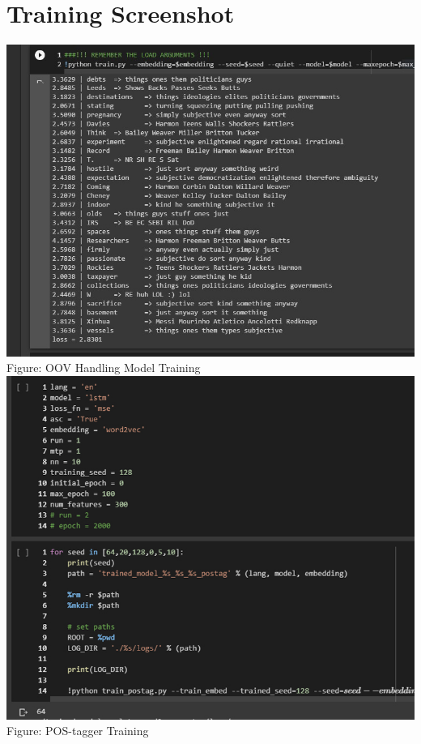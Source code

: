 \documentclass[a4paper,12pt]{report}
\begin{document}
\section*{Training Screenshot}
\centering
\includegraphics[width=.8\linewidth]{images/train_oovmodel.jpg}\\
Figure: OOV Handling Model Training
\centering
\includegraphics[width=.8\linewidth]{images/train_postag.jpg}\\
Figure: POS-tagger Training\\~\\
\end{document}
